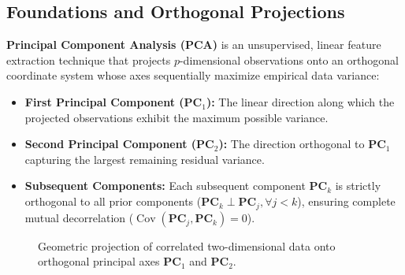\subsection{Foundations and Orthogonal Projections}
\textbf{Principal Component Analysis (PCA)} is an unsupervised, linear feature extraction technique that projects $p$-dimensional observations onto an orthogonal coordinate system whose axes sequentially maximize empirical data variance:
\begin{itemize}
    \item \textbf{First Principal Component ($\mathbf{PC}_1$):} The linear direction along which the projected observations exhibit the maximum possible variance.
    \item \textbf{Second Principal Component ($\mathbf{PC}_2$):} The direction orthogonal to $\mathbf{PC}_1$ capturing the largest remaining residual variance.
    \item \textbf{Subsequent Components:} Each subsequent component $\mathbf{PC}_k$ is strictly orthogonal to all prior components ($\mathbf{PC}_k \perp \mathbf{PC}_j, \forall j < k$), ensuring complete mutual decorrelation ($\operatorname{Cov}(\mathbf{PC}_j, \mathbf{PC}_k) = 0$).
\end{itemize}

\begin{figure}[htbp]
\centering
{}
\caption{Geometric projection of correlated two-dimensional data onto orthogonal principal axes $\mathbf{PC}_1$ and $\mathbf{PC}_2$.}
\label{fig:pca_geometry}
\end{figure}

